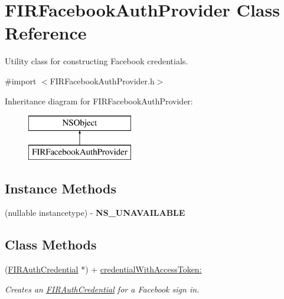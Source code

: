 \hypertarget{interface_f_i_r_facebook_auth_provider}{}\section{F\+I\+R\+Facebook\+Auth\+Provider Class Reference}
\label{interface_f_i_r_facebook_auth_provider}


Utility class for constructing Facebook credentials.  




{\ttfamily \#import $<$F\+I\+R\+Facebook\+Auth\+Provider.\+h$>$}

Inheritance diagram for F\+I\+R\+Facebook\+Auth\+Provider\+:\begin{figure}[H]
\begin{center}
\leavevmode
\includegraphics[height=2.000000cm]{interface_f_i_r_facebook_auth_provider}
\end{center}
\end{figure}
\subsection*{Instance Methods}
\begin{DoxyCompactItemize}
\item 
\hypertarget{interface_f_i_r_facebook_auth_provider_a3bf24c5f4cb198ad0baf2e19f99bdacd}{}(nullable instancetype) -\/ {\bfseries N\+S\+\_\+\+U\+N\+A\+V\+A\+I\+L\+A\+B\+L\+E}\label{interface_f_i_r_facebook_auth_provider_a3bf24c5f4cb198ad0baf2e19f99bdacd}

\end{DoxyCompactItemize}
\subsection*{Class Methods}
\begin{DoxyCompactItemize}
\item 
(\hyperlink{interface_f_i_r_auth_credential}{F\+I\+R\+Auth\+Credential} $\ast$) + \hyperlink{interface_f_i_r_facebook_auth_provider_aa9fde3160a06f935e7cea66789de94bd}{credential\+With\+Access\+Token\+:}
\begin{DoxyCompactList}\small\item\em Creates an {\ttfamily \hyperlink{interface_f_i_r_auth_credential}{F\+I\+R\+Auth\+Credential}} for a Facebook sign in. \end{DoxyCompactList}\end{DoxyCompactItemize}


